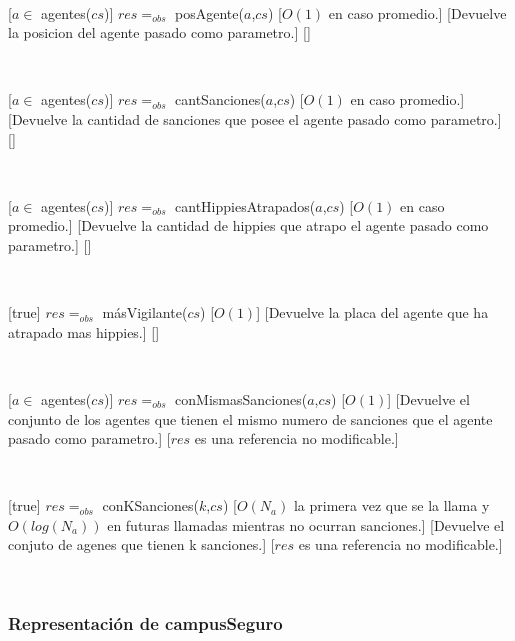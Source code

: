 ~

[$a \in$ agentes($cs$)]
{$res =_{obs}$ posAgente($a$,$cs$)}
[$O(1)$ en caso promedio.]
[Devuelve la posicion del agente pasado como parametro.]
[]

~

[$a \in$ agentes($cs$)]
{$res =_{obs}$ cantSanciones($a$,$cs$)}
[$O(1)$ en caso promedio.]
[Devuelve la cantidad de sanciones que posee el agente pasado como parametro.]
[]

~

[$a \in$ agentes($cs$)]
{$res =_{obs}$ cantHippiesAtrapados($a$,$cs$)}
[$O(1)$ en caso promedio.]
[Devuelve la cantidad de hippies que atrapo el agente pasado como parametro.]
[]

~

[true]
{$res =_{obs}$ másVigilante($cs$)}
[$O(1)$]
[Devuelve la placa del agente que ha atrapado mas hippies.]
[]

~

[$a \in$ agentes($cs$)]
{$res =_{obs}$ conMismasSanciones($a$,$cs$)}
[$O(1)$]
[Devuelve el conjunto de los agentes que tienen el mismo numero de sanciones que el agente pasado como parametro.]
[$res$ es una referencia no modificable.]

~

[true]
{$res =_{obs}$ conKSanciones($k$,$cs$)}
[$O(N_a)$ la primera vez que se la llama y $O(log(N_a))$ en futuras llamadas mientras no ocurran sanciones.]
[Devuelve el conjuto de agenes que tienen k sanciones.]
[$res$ es una referencia no modificable.]

~
\pagebreak

\subsubsection{Representación de campusSeguro}

